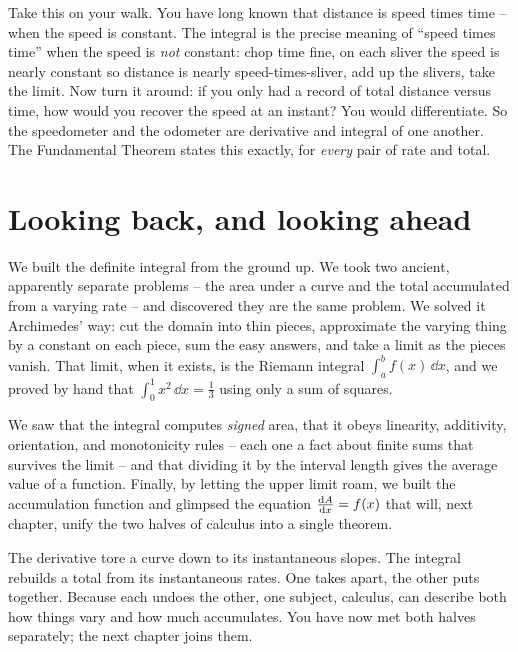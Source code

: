 \begin{walkbox}
Take this on your walk. You have long known that distance is speed
times time -- when the speed is constant. The integral is the precise meaning of
``speed times time'' when the speed is \emph{not} constant: chop time fine, on
each sliver the speed is nearly constant so distance is nearly speed-times-sliver,
add up the slivers, take the limit. Now turn it around: if you only had a record
of total distance versus time, how would you recover the speed at an instant? You
would differentiate. So the speedometer and the odometer are derivative and
integral of one another. The Fundamental Theorem states this exactly, for
\emph{every} pair of rate and total.
\end{walkbox}

\section{Looking back, and looking ahead}
\label{ch20:summary}

We built the definite integral from the ground up. We took two ancient,
apparently separate problems -- the area under a curve and the total accumulated
from a varying rate -- and discovered they are the same problem. We solved it
Archimedes' way: cut the domain into thin pieces, approximate the varying thing
by a constant on each piece, sum the easy answers, and take a limit as the pieces
vanish. That limit, when it exists, is the Riemann integral
$\int_a^b f(x)\,\dd x$, and we proved by hand that $\int_0^1 x^2\,\dd x =
\tfrac13$ using only a sum of squares.

We saw that the integral computes \emph{signed} area, that it obeys
linearity, additivity, orientation, and monotonicity rules -- each one a fact
about finite sums that survives the limit -- and that dividing it by the interval
length gives the average value of a function. Finally, by letting the upper limit
roam, we built the accumulation function and glimpsed the equation
$\frac{\mathrm{d} A}{\mathrm{d} x}=f(x)$ that will, next chapter, unify the two halves of calculus into a
single theorem.

\begin{aestheticbox}
The derivative tore a curve down to its instantaneous slopes. The integral
rebuilds a total from its instantaneous rates. One takes apart, the other puts
together. Because each undoes the
other, one subject, calculus, can describe both how things vary and how
much accumulates. You have now met both halves separately; the next chapter
joins them.
\end{aestheticbox}

